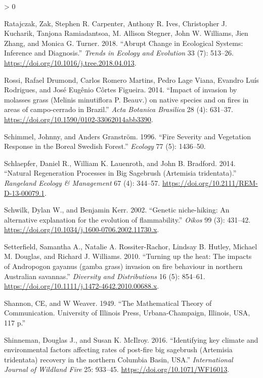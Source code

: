 \documentclass[
  12pt,
]{article}
\newlength{\cslhangindent}
\newenvironment{CSLReferences}[2] %
 {%
  \setlength{\parindent}{0pt}
  \ifodd #1 \everypar{\setlength{\hangindent}{\cslhangindent}}\ignorespaces\fi
  \ifnum #2 > 0
  \setlength{\parskip}{#2\baselineskip}
  \fi
 }%
 {}
\begin{document}
\begin{CSLReferences}{1}{0}
\leavevmode\hypertarget{ref-Ratajczak2018}{}%
Ratajczak, Zak, Stephen R. Carpenter, Anthony R. Ives, Christopher J.
Kucharik, Tanjona Ramiadantsoa, M. Allison Stegner, John W. Williams,
Jien Zhang, and Monica G. Turner. 2018. {``{Abrupt Change in Ecological
Systems: Inference and Diagnosis}.''} \emph{Trends in Ecology and
Evolution} 33 (7): 513--26.
\url{https://doi.org/10.1016/j.tree.2018.04.013}.

\leavevmode\hypertarget{ref-Rossi2014}{}%
Rossi, Rafael Drumond, Carlos Romero Martins, Pedro Lage Viana, Evandro
Luís Rodrigues, and José Eugênio Côrtes Figueira. 2014. {``{Impact of
invasion by molasses grass (Melinis minutiflora P. Beauv.) on native
species and on fires in areas of campo-cerrado in Brazil}.''} \emph{Acta
Botanica Brasilica} 28 (4): 631--37.
\url{https://doi.org/10.1590/0102-33062014abb3390}.

\leavevmode\hypertarget{ref-Schimmel1996}{}%
Schimmel, Johnny, and Anders Granström. 1996. {``{Fire Severity and
Vegetation Response in the Boreal Swedish Forest}.''} \emph{Ecology} 77
(5): 1436--50.

\leavevmode\hypertarget{ref-Schlaepfer2014}{}%
Schlaepfer, Daniel R., William K. Lauenroth, and John B. Bradford. 2014.
{``{Natural Regeneration Processes in Big Sagebrush (Artemisia
tridentata)}.''} \emph{Rangeland Ecology \& Management} 67 (4): 344--57.
\url{https://doi.org/10.2111/REM-D-13-00079.1}.

\leavevmode\hypertarget{ref-Schwilk2002}{}%
Schwilk, Dylan W., and Benjamin Kerr. 2002. {``{Genetic niche-hiking: An
alternative explanation for the evolution of flammability}.''}
\emph{Oikos} 99 (3): 431--42.
\url{https://doi.org/10.1034/j.1600-0706.2002.11730.x}.

\leavevmode\hypertarget{ref-Setterfield2010}{}%
Setterfield, Samantha A., Natalie A. Rossiter-Rachor, Lindsay B. Hutley,
Michael M. Douglas, and Richard J. Williams. 2010. {``{Turning up the
heat: The impacts of Andropogon gayanus (gamba grass) invasion on fire
behaviour in northern Australian savannas}.''} \emph{Diversity and
Distributions} 16 (5): 854--61.
\url{https://doi.org/10.1111/j.1472-4642.2010.00688.x}.

\leavevmode\hypertarget{ref-Shannon1949}{}%
Shannon, CE, and W Weaver. 1949. {``The Mathematical Theory of
Communication. University of Illinois Press, Urbana-Champaign, Illinois,
USA, 117 p.''}

\leavevmode\hypertarget{ref-Shinneman2016}{}%
Shinneman, Douglas J., and Susan K. McIlroy. 2016. {``{Identifying key
climate and environmental factors affecting rates of post-fire big
sagebrush (Artemisia tridentata) recovery in the northern Columbia
Basin, USA}.''} \emph{International Journal of Wildland Fire} 25:
933--45. \url{https://doi.org/10.1071/WF16013}.


\end{CSLReferences}
\end{document}
